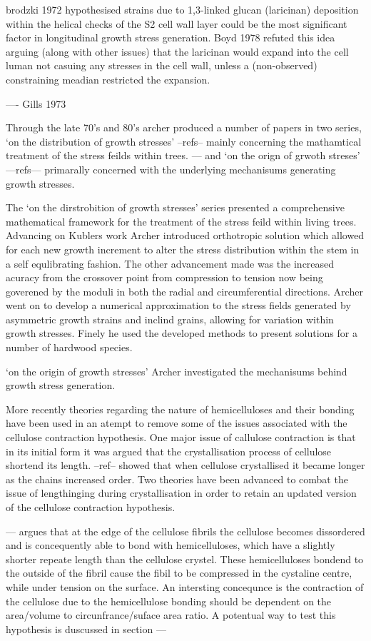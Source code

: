 \documentclass{article}
\begin{document}
brodzki 1972 hypothesised strains due to 1,3-linked glucan (laricinan)
deposition within the helical checks of the S2 cell wall layer could be the
most significant factor in longitudinal growth stress generation. Boyd 1978
refuted this idea arguing (along with other issues) that the laricinan would
expand into the cell luman not casuing any stresses in the cell wall, unless a
(non-observed) constraining meadian restricted the expansion.

---- Gills 1973

Through the late 70's and 80's archer produced a number of papers in two series,
`on the distribution of growth stresses' --refs-- mainly concerning the
mathamtical treatment of the stress feilds within trees. --- and `on the
orign of grwoth streses' ---refs--- primarally concerned with the underlying
mechanisums generating growth stresses.

The `on the dirstrobition of growth stresses' series presented a comprehensive
mathematical framework for the treatment of the stress feild within living
trees. Advancing on Kublers work Archer introduced orthotropic solution which
allowed for each new growth increment to alter the stress distribution within
the stem in a self equlibrating fashion. The other advancement made was the
increased acuracy from the crossover point from compression to tension now being
goverened by the moduli in both the radial and circumferential directions.
Archer went on to develop a numerical approximation to the stress fields
generated by asymmetric growth strains and inclind grains, allowing for
variation within growth stresses. Finely he used the developed methods to
present solutions for a number of hardwood species.

`on the origin of growth stresses' Archer investigated the mechanisums behind
growth stress generation.

More recently theories regarding the nature of hemicelluloses and their bonding
have been used in an atempt to remove some of the issues associated with the
cellulose contraction hypothesis. One major issue of callulose contraction is
that in its initial form it was argued that the crystallisation process of cellulose
shortend its length. --ref-- showed that when cellulose crystallised it became
longer as the chains increased order. Two theories have been advanced to combat
the issue of lengthinging during crystallisation in order to retain an updated
version of the cellulose contraction hypothesis.

--- argues that at the edge of the cellulose fibrils the cellulose becomes
dissordered and is concequently able to bond with hemicelluloses, which have a
slightly shorter repeate length than the cellulose crystel. These hemicelluloses
bondend to the outside of the fibril cause the fibil to be compressed in the
cystaline centre, while under tension on the surface. An intersting concequnce
is the contraction of the cellulose due to the hemicellulose bonding should be
dependent on the area/volume to circunfrance/suface area ratio. A potentual way
to test this hypothesis is duscussed in section ---
\end{document}
